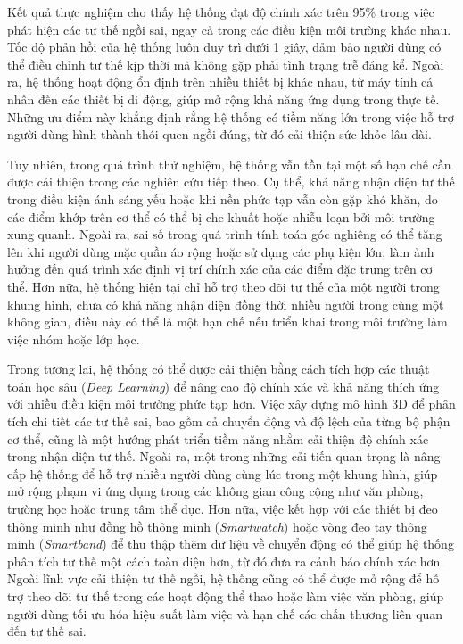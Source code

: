 \documentclass[conference]{IEEEtran}
\begin{document}
Kết quả thực nghiệm cho thấy hệ thống đạt độ chính xác trên 95\% trong việc phát hiện các tư thế ngồi sai, ngay cả trong các điều kiện môi trường khác nhau. Tốc độ phản hồi của hệ thống luôn duy trì dưới 1 giây, đảm bảo người dùng có thể điều chỉnh tư thế kịp thời mà không gặp phải tình trạng trễ đáng kể. Ngoài ra, hệ thống hoạt động ổn định trên nhiều thiết bị khác nhau, từ máy tính cá nhân đến các thiết bị di động, giúp mở rộng khả năng ứng dụng trong thực tế. Những ưu điểm này khẳng định rằng hệ thống có tiềm năng lớn trong việc hỗ trợ người dùng hình thành thói quen ngồi đúng, từ đó cải thiện sức khỏe lâu dài.

Tuy nhiên, trong quá trình thử nghiệm, hệ thống vẫn tồn tại một số hạn chế cần được cải thiện trong các nghiên cứu tiếp theo. Cụ thể, khả năng nhận diện tư thế trong điều kiện ánh sáng yếu hoặc khi nền phức tạp vẫn còn gặp khó khăn, do các điểm khớp trên cơ thể có thể bị che khuất hoặc nhiễu loạn bởi môi trường xung quanh. Ngoài ra, sai số trong quá trình tính toán góc nghiêng có thể tăng lên khi người dùng mặc quần áo rộng hoặc sử dụng các phụ kiện lớn, làm ảnh hưởng đến quá trình xác định vị trí chính xác của các điểm đặc trưng trên cơ thể. Hơn nữa, hệ thống hiện tại chỉ hỗ trợ theo dõi tư thế của một người trong khung hình, chưa có khả năng nhận diện đồng thời nhiều người trong cùng một không gian, điều này có thể là một hạn chế nếu triển khai trong môi trường làm việc nhóm hoặc lớp học.

Trong tương lai, hệ thống có thể được cải thiện bằng cách tích hợp các thuật toán học sâu (\textit{Deep Learning}) để nâng cao độ chính xác và khả năng thích ứng với nhiều điều kiện môi trường phức tạp hơn. Việc xây dựng mô hình 3D để phân tích chi tiết các tư thế sai, bao gồm cả chuyển động và độ lệch của từng bộ phận cơ thể, cũng là một hướng phát triển tiềm năng nhằm cải thiện độ chính xác trong nhận diện tư thế. Ngoài ra, một trong những cải tiến quan trọng là nâng cấp hệ thống để hỗ trợ nhiều người dùng cùng lúc trong một khung hình, giúp mở rộng phạm vi ứng dụng trong các không gian công cộng như văn phòng, trường học hoặc trung tâm thể dục. Hơn nữa, việc kết hợp với các thiết bị đeo thông minh như đồng hồ thông minh (\textit{Smartwatch}) hoặc vòng đeo tay thông minh (\textit{Smartband}) để thu thập thêm dữ liệu về chuyển động có thể giúp hệ thống phân tích tư thế một cách toàn diện hơn, từ đó đưa ra cảnh báo chính xác hơn. Ngoài lĩnh vực cải thiện tư thế ngồi, hệ thống cũng có thể được mở rộng để hỗ trợ theo dõi tư thế trong các hoạt động thể thao hoặc làm việc văn phòng, giúp người dùng tối ưu hóa hiệu suất làm việc và hạn chế các chấn thương liên quan đến tư thế sai.
\end{document}
